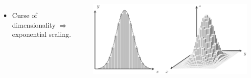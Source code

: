 \documentclass[aspectratio=169]{beamer}
\begin{document}
\begin{frame}
\begin{columns}
\begin{itemize}
            \item Curse of dimensionality $\Rightarrow$ exponential scaling.
        \end{itemize}
        \includegraphics[width=\textwidth]{figures/integration}
    \end{columns}
\end{frame}
\end{document}
